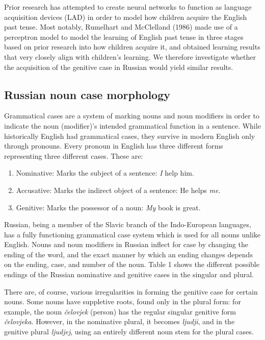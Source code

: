 \documentclass[11pt,a4paper]{article}
\begin{document}
Prior research has attempted to create neural networks to function as
language acquisition devices (LAD) in order to model how children acquire
the English past tense. Most notably, Rumelhart and McClelland (1986)
made use of a perceptron model to model the learning of English past
tense in three stages based on prior research into how children
acquire it, and obtained learning results that very closely
align with children's learning. We therefore investigate whether
the acquisition of the genitive case in Russian would yield similar results.

\subsection{Russian noun case morphology}

Grammatical cases are a system of marking nouns and noun modifiers in order
to indicate the noun (modifier)'s intended grammatical function in a sentence.
While historically English had grammatical cases, they survive in modern English
only through pronouns. Every pronoun in English has three different forms representing
three different cases. These are:

\begin{enumerate}
    \item Nominative: Marks the subject of a sentence: \emph{I} help him.
    \item Accusative: Marks the indirect object of a sentence: He helps \emph{me}.
    \item Genitive: Marks the possessor of a noun: \emph{My} book is great.
\end{enumerate}

Russian, being a member of the Slavic branch of the Indo-European languages,
has a fully functioning grammatical case system which is used for all nouns
unlike English. Nouns and noun modifiers in Russian inflect for case
by changing the ending of the word, and the exact manner by which an ending
changes depends on the ending, case, and number of the noun. Table 1 shows 
the different possible endings of the Russian nominative and genitive cases in 
the singular and plural. 

There are, of course, various irregularities in forming the genitive case
for certain nouns. Some nouns have suppletive roots, found only in the
plural form: for example, the noun \emph{\v{c}elovjek} (person) has the regular singular 
genitive form \emph{\v{c}elovjeka}. However, in the nominative plural, it becomes
\emph{ljudji}, and in the genitive plural \emph{ljudjej}, using an entirely different
noun stem for the plural cases.
\end{document}
